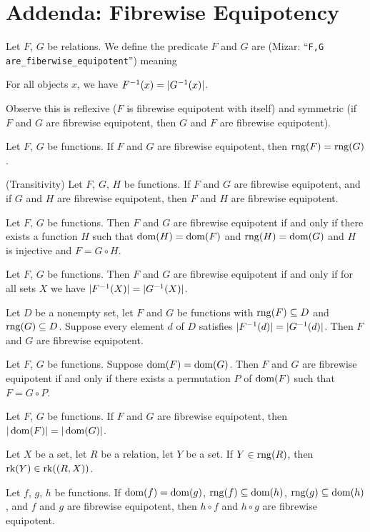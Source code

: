 \documentclass{article}
\begin{document}
\section*{Addenda: Fibrewise Equipotency}

\begin{definition}
Let $F$, $G$ be relations.
We define the predicate $F$ and $G$ are 
(Mizar: ``\verb#F,G are_fiberwise_equipotent#'') meaning
\begin{defn}
\item For all objects $x$, we have $F^{-1}(x)=|G^{-1}(x)|$.
\end{defn}
Observe this is reflexive ($F$ is fibrewise equipotent with itself) and
symmetric (if $F$ and $G$ are fibrewise equipotent, then $G$ and $F$ are
fibrewise equipotent).
\end{definition}

\begin{thm}
\item\label{classes1:75} Let $F$, $G$ be functions.
  If $F$ and $G$ are fibrewise equipotent, then $\operatorname{rng}(F)=\operatorname{rng}(G)$.
\item\label{classes1:76} (Transitivity) Let $F$, $G$, $H$ be functions.
  If $F$ and $G$ are fibrewise equipotent, and if $G$ and $H$ are
  fibrewise equipotent, then $F$ and $H$ are fibrewise equipotent.
\item\label{classes1:77} Let $F$, $G$ be functions.
  Then $F$ and $G$ are fibrewise equipotent if and only if there exists
  a function $H$ such that $\operatorname{dom}(H)=\operatorname{dom}(F)$ and $\operatorname{rng}(H)=\operatorname{dom}(G)$ and
  $H$ is injective and $F=G\circ H$.
\item\label{classes1:78} Let $F$, $G$ be functions.
  Then $F$ and $G$ are fibrewise equipotent if and only if for all sets
  $X$ we have $|F^{-1}(X)|=|G^{-1}(X)|$.
\item\label{classes1:79} Let $D$ be a nonempty set, let $F$ and $G$ be
  functions with $\operatorname{rng}(F)\subseteq D$ and $\operatorname{rng}(G)\subseteq D$.
  Suppose every element $d$ of $D$ satisfies $|F^{-1}(d)|=|G^{-1}(d)|$.
  Then $F$ and $G$ are fibrewise equipotent.
\item\label{classes1:80} Let $F$, $G$ be functions.
  Suppose $\operatorname{dom}(F)=\operatorname{dom}(G)$.
  Then $F$ and $G$ are fibrewise equipotent if and only if there exists
  a permutation $P$ of $\operatorname{dom}(F)$ such that $F=G\circ P$.
\item\label{classes1:81} Let $F$, $G$ be functions.
  If $F$ and $G$ are fibrewise equipotent, then $|\operatorname{dom}(F)|=|\operatorname{dom}(G)|$.
\item\label{classes1:82} Let $X$ be a set, let $R$ be a relation, let
  $Y$ be a set. If $Y\in\operatorname{rng}(R)$, then $\operatorname{rk}(Y)\in\operatorname{rk}((R,X))$.
\item\label{classes1:83} Let $f$, $g$, $h$ be functions.
  If $\operatorname{dom}(f)=\operatorname{dom}(g)$, $\operatorname{rng}(f)\subseteq\operatorname{dom}(h)$, $\operatorname{rng}(g)\subseteq\operatorname{dom}(h)$,
  and $f$ and $g$ are fibrewise equipotent, then $h\circ f$ and $h\circ g$
  are fibrewise equipotent.
\end{thm}
\end{document}
